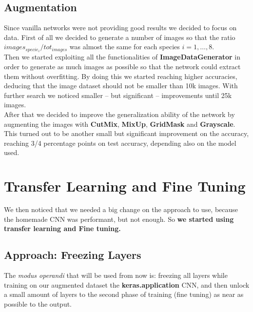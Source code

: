 \documentclass[11pt]{article}
\begin{document}
\subsection{Augmentation}\label{subsec:augmentation}
Since vanilla networks were not providing good results we decided to focus on data.
First of all we decided to generate a number of images so that the ratio $images_{specie_i}/tot_{images}$ was almost the same for each species $i=1,\dots,8$.\\[0.1cm]
Then we started exploiting all the functionalities of \textbf{ImageDataGenerator} in order to generate as much images as possible so that the network could extract them without overfitting.
By doing this we started reaching higher accuracies, deducing that the image dataset should not be smaller than 10k images. With further search we noticed smaller -- but significant -- improvements until 25k images.\\[0.1cm]
After that we decided to improve the generalization ability of the network by augmenting the images with \textbf{CutMix}, \textbf{MixUp}, \textbf{GridMask} and \textbf{Grayscale}.
This turned out to be another small but significant improvement on the accuracy, reaching 3/4 percentage points on test accuracy, depending also on the model used.


\section{Transfer Learning and Fine Tuning}
We then noticed that we needed a big change on the approach to use, because the homemade
CNN was performant, but not enough. So \textbf{we started using transfer learning and Fine tuning.}

\subsection{Approach: Freezing Layers}
The \textit{modus operandi} that will be used from now is: freezing all layers while training on our augmented dataset the \textbf{keras.application} CNN, and then unlock a small amount of layers to the second phase of training (fine tuning) as near as possible to the output.
\end{document}
